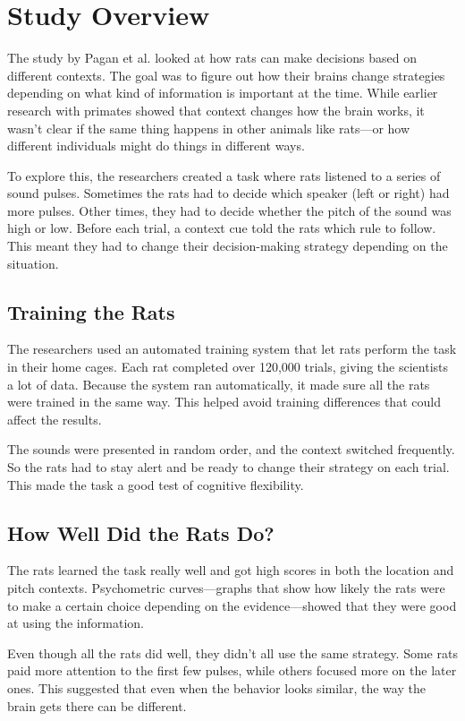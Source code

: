 \documentclass{article}
\begin{document}
\section{Study Overview}
The study by Pagan et al. looked at how rats can make decisions based on different contexts. The goal was to figure out how their brains change strategies depending on what kind of information is important at the time. While earlier research with primates showed that context changes how the brain works, it wasn’t clear if the same thing happens in other animals like rats—or how different individuals might do things in different ways.

To explore this, the researchers created a task where rats listened to a series of sound pulses. Sometimes the rats had to decide which speaker (left or right) had more pulses. Other times, they had to decide whether the pitch of the sound was high or low. Before each trial, a context cue told the rats which rule to follow. This meant they had to change their decision-making strategy depending on the situation.

\subsection{Training the Rats}
The researchers used an automated training system that let rats perform the task in their home cages. Each rat completed over 120,000 trials, giving the scientists a lot of data. Because the system ran automatically, it made sure all the rats were trained in the same way. This helped avoid training differences that could affect the results.

The sounds were presented in random order, and the context switched frequently. So the rats had to stay alert and be ready to change their strategy on each trial. This made the task a good test of cognitive flexibility.

\subsection{How Well Did the Rats Do?}
The rats learned the task really well and got high scores in both the location and pitch contexts. Psychometric curves—graphs that show how likely the rats were to make a certain choice depending on the evidence—showed that they were good at using the information.

Even though all the rats did well, they didn’t all use the same strategy. Some rats paid more attention to the first few pulses, while others focused more on the later ones. This suggested that even when the behavior looks similar, the way the brain gets there can be different.
\end{document}
